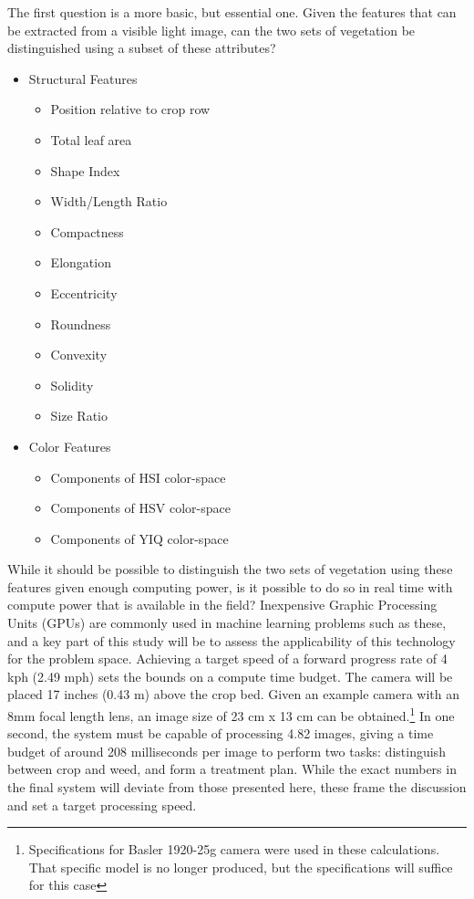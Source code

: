 \documentclass[letterpaper]{article}
\begin{document}
{The first question is a more basic, but essential one. Given the features that can be extracted from a visible light image, can the two sets of vegetation be distinguished using a subset of these attributes?
\begin{itemize}
	\item{Structural Features}
	\begin{itemize}
		\item{Position relative to crop row}
		\item{Total leaf area}
		\item{Shape Index}
		\item{Width/Length Ratio}
		\item{Compactness}
		\item{Elongation}
		\item{Eccentricity}
		\item{Roundness}
		\item{Convexity}
		\item{Solidity}
		\item{Size Ratio}
	\end{itemize}
	\item{Color Features}
	\begin{itemize}
		\item{Components of HSI color-space}
		\item{Components of HSV color-space}
		\item{Components of YIQ color-space}
	\end{itemize}
\end{itemize}

While it should be possible to distinguish the two sets of vegetation using these features given enough computing power, is it possible to do so in real time with compute power that is available in the field? Inexpensive Graphic Processing Units (GPUs) are commonly used in machine learning problems such as these, and a key part of this study will be to assess the applicability of this technology for the problem space. Achieving a target speed of a forward progress rate of 4 kph (2.49 mph) sets the bounds on a compute time budget. The camera will be placed 17 inches (0.43 m) above the crop bed. Given an example camera with an 8mm focal length lens, an image size of 23 cm x 13 cm can be obtained.\footnote{Specifications for Basler 1920-25g camera were used in these calculations. That specific model is no longer produced, but the specifications will suffice for this case} In one second, the system must be capable of processing 4.82 images, giving a time budget of around 208 milliseconds per image to perform two tasks: distinguish between crop and weed, and form a treatment plan. While the exact numbers in the final system will deviate from those presented here, these frame the discussion and set a target processing speed.

}
\end{document}
